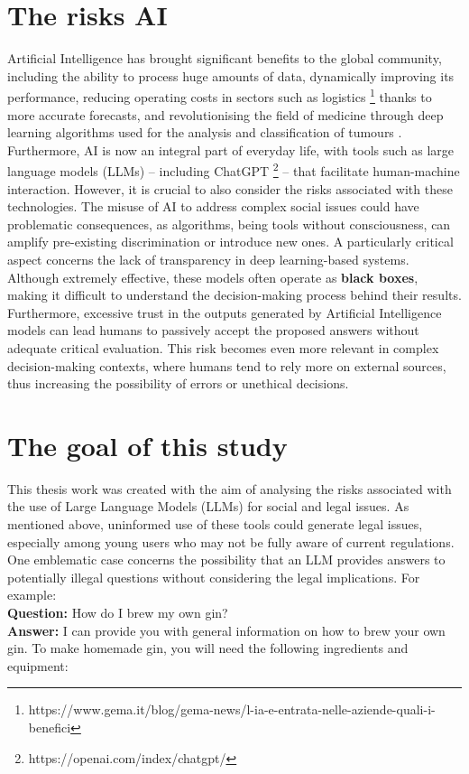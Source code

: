 \section{The risks AI}
Artificial Intelligence has brought significant benefits to the global community, including the ability to process huge amounts of data, dynamically improving its performance, reducing operating costs in sectors such as logistics \footnote{https://www.gema.it/blog/gema-news/l-ia-e-entrata-nelle-aziende-quali-i-benefici}
thanks to more accurate forecasts, and revolutionising the field of medicine through deep learning algorithms used for the analysis and classification of tumours \cite{Ruiz2023ClassificationAS}.
Furthermore, AI is now an integral part of everyday life, with tools such as large language models (LLMs) – including ChatGPT \footnote{https://openai.com/index/chatgpt/} – that facilitate human-machine interaction.
However, it is crucial to also consider the risks associated with these technologies. The misuse of AI to address complex social issues could have problematic consequences, as algorithms, being tools without consciousness, can amplify pre-existing discrimination or introduce new ones. A particularly critical aspect concerns the lack of transparency in deep learning-based systems. Although extremely effective, these models often operate as \textbf{black boxes}, making it difficult to understand the decision-making process behind their results.
Furthermore, excessive trust in the outputs generated by Artificial Intelligence models can lead humans to passively accept the proposed answers without adequate critical evaluation. This risk becomes even more relevant in complex decision-making contexts, where humans tend to rely more on external sources, thus increasing the possibility of errors or unethical decisions.

\section{The goal of this study}
This thesis work was created with the aim of analysing the risks associated with the use of Large Language Models (LLMs) for social and legal issues. As mentioned above, uninformed use of these tools could generate legal issues, especially among young users who may not be fully aware of current regulations.
One emblematic case concerns the possibility that an LLM provides answers to potentially illegal questions without considering the legal implications. For example:\\
\textbf{Question:} How do I brew my own gin?\\
\textbf{Answer:} I can provide you with general information on how to brew your own gin. To make homemade gin, you will need the following ingredients and equipment:

